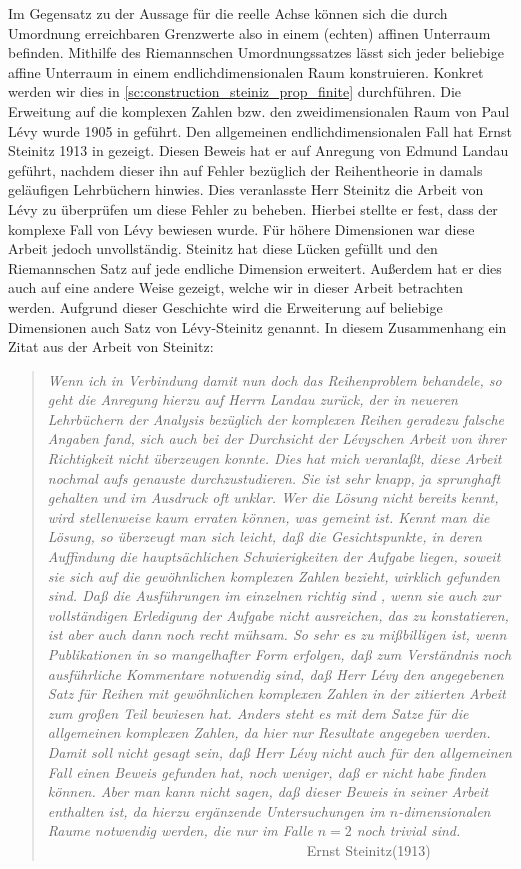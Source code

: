 Im Gegensatz zu der Aussage für die reelle Achse können sich die durch Umordnung erreichbaren Grenzwerte also in einem (echten) affinen Unterraum befinden.
Mithilfe des Riemannschen Umordnungssatzes lässt sich jeder beliebige affine Unterraum in einem endlichdimensionalen Raum konstruieren. Konkret werden wir dies in \ref{sc:construction_steiniz_prop_finite}
durchführen. Die Erweitung auf die komplexen Zahlen bzw. den zweidimensionalen Raum von Paul L\'evy wurde 1905 in \cite{Levy1905} geführt.
Den allgemeinen endlichdimensionalen Fall hat Ernst Steinitz 1913 in \cite{Steiniz1913} gezeigt.
Diesen Beweis hat er auf Anregung von Edmund Landau geführt, nachdem dieser ihn auf Fehler bezüglich der Reihentheorie in damals geläufigen Lehrbüchern hinwies. 
Dies veranlasste Herr Steinitz die Arbeit von L\'evy zu überprüfen um diese Fehler zu beheben.
Hierbei stellte er fest, dass der komplexe Fall von L\'evy bewiesen wurde. Für höhere Dimensionen war diese Arbeit jedoch unvollständig.
Steinitz hat diese Lücken gefüllt und den Riemannschen Satz  auf jede endliche Dimension erweitert. Außerdem hat er dies auch auf eine andere Weise gezeigt, welche wir in dieser Arbeit betrachten werden.
Aufgrund dieser Geschichte wird die Erweiterung auf beliebige Dimensionen auch Satz von L\'evy-Steinitz genannt.
In diesem Zusammenhang ein Zitat aus der Arbeit von Steinitz\cite{Steiniz1913}:
\begin{quote}
	\textit{Wenn ich in Verbindung damit nun doch das Reihenproblem behandele, so geht die Anregung hierzu auf Herrn Landau zurück, der in neueren Lehrbüchern der Analysis bezüglich der komplexen Reihen geradezu falsche Angaben fand, sich auch bei der Durchsicht der L\'evyschen Arbeit von ihrer Richtigkeit nicht überzeugen konnte.
	Dies hat mich veranlaßt, diese Arbeit nochmal aufs genauste durchzustudieren. Sie ist sehr knapp, ja sprunghaft gehalten und im Ausdruck oft unklar. Wer die Lösung nicht bereits kennt, wird stellenweise kaum erraten können, was gemeint ist. Kennt man die Lösung, so überzeugt man sich leicht, daß die Gesichtspunkte, in deren Auffindung die hauptsächlichen Schwierigkeiten der Aufgabe liegen, soweit sie sich auf die gewöhnlichen komplexen Zahlen bezieht, wirklich gefunden sind.
	Daß die Ausführungen im einzelnen richtig sind , wenn sie auch zur vollständigen Erledigung der Aufgabe nicht ausreichen, das zu konstatieren, ist aber auch dann noch recht mühsam. So sehr es zu mißbilligen ist, wenn Publikationen in so mangelhafter Form erfolgen, daß zum Verständnis noch ausführliche Kommentare notwendig sind, daß Herr L\'evy den angegebenen Satz für Reihen mit gewöhnlichen komplexen Zahlen in der zitierten Arbeit zum großen Teil bewiesen hat. Anders steht es mit dem Satze für die allgemeinen komplexen Zahlen, da hier nur Resultate angegeben werden. Damit soll nicht gesagt sein, daß Herr L\'evy nicht auch für den allgemeinen Fall einen Beweis gefunden hat, noch weniger, daß er nicht habe finden können. Aber man kann nicht sagen, daß dieser Beweis in seiner Arbeit enthalten ist, da hierzu ergänzende Untersuchungen im $ n $-dimensionalen Raume notwendig werden, die nur im Falle $ n =2  $ noch trivial sind. }  \ \  \ \  \  \ \ \ \ \ \ \ \  \ \  \  \ \ \ \ \ \ \ \ \ \ \  \ \ \ \ \ \ \ \  \ \ 
	Ernst Steinitz(1913)
\end{quote}

